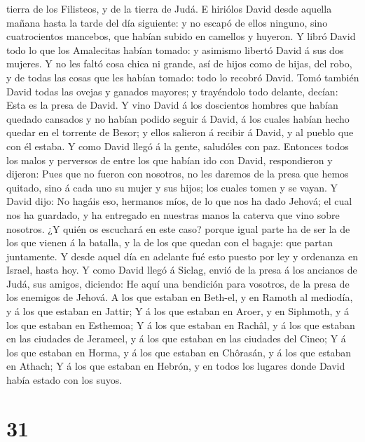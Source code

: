 tierra de los Filisteos, y de la tierra de Judá.  E
hiriólos David desde aquella mañana hasta la tarde del día siguiente: y
no escapó de ellos ninguno, sino cuatrocientos mancebos, que habían
subido en camellos y huyeron.  Y libró David todo lo que
los Amalecitas habían tomado: y asimismo libertó David á sus dos
mujeres.  Y no les faltó cosa chica ni grande, así de hijos
como de hijas, del robo, y de todas las cosas que les habían tomado:
todo lo recobró David.  Tomó también David todas las ovejas
y ganados mayores; y trayéndolo todo delante, decían: Esta es la presa
de David.  Y vino David á los doscientos hombres que habían
quedado cansados y no habían podido seguir á David, á los cuales habían
hecho quedar en el torrente de Besor; y ellos salieron á recibir á
David, y al pueblo que con él estaba. Y como David llegó á la gente,
saludóles con paz.  Entonces todos los malos y perversos de
entre los que habían ido con David, respondieron y dijeron: Pues que no
fueron con nosotros, no les daremos de la presa que hemos quitado, sino
á cada uno su mujer y sus hijos; los cuales tomen y se vayan.
 Y David dijo: No hagáis eso, hermanos míos, de lo que nos
ha dado Jehová; el cual nos ha guardado, y ha entregado en nuestras
manos la caterva que vino sobre nosotros.  ¿Y quién os
escuchará en este caso? porque igual parte ha de ser la de los que
vienen á la batalla, y la de los que quedan con el bagaje: que partan
juntamente.  Y desde aquel día en adelante fué esto puesto
por ley y ordenanza en Israel, hasta hoy.  Y como David
llegó á Siclag, envió de la presa á los ancianos de Judá, sus amigos,
diciendo: He aquí una bendición para vosotros, de la presa de los
enemigos de Jehová.  A los que estaban en Beth-el, y en
Ramoth al mediodía, y á los que estaban en Jattir;  Y á los
que estaban en Aroer, y en Siphmoth, y á los que estaban en Esthemoa;
 Y á los que estaban en Rachâl, y á los que estaban en las
ciudades de Jerameel, y á los que estaban en las ciudades del Cineo;
 Y á los que estaban en Horma, y á los que estaban en
Chôrasán, y á los que estaban en Athach;  Y á los que
estaban en Hebrón, y en todos los lugares donde David había estado con
los suyos.

\hypertarget{section-30}{%
\section{31}\label{section-30}}

